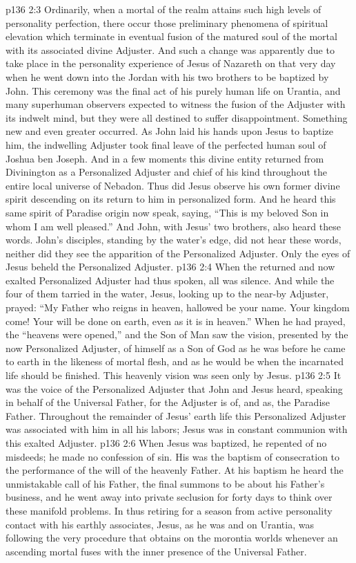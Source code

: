 \vs p136 2:3 Ordinarily, when a mortal of the realm attains such high levels of personality perfection, there occur those preliminary phenomena of spiritual elevation which terminate in eventual fusion of the matured soul of the mortal with its associated divine Adjuster. And such a change was apparently due to take place in the personality experience of Jesus of Nazareth on that very day when he went down into the Jordan with his two brothers to be baptized by John. This ceremony was the final act of his purely human life on Urantia, and many superhuman observers expected to witness the fusion of the Adjuster with its indwelt mind, but they were all destined to suffer disappointment. Something new and even greater occurred. As John laid his hands upon Jesus to baptize him, the indwelling Adjuster took final leave of the perfected human soul of Joshua ben Joseph. And in a few moments this divine entity returned from Divinington as a Personalized Adjuster and chief of his kind throughout the entire local universe of Nebadon. Thus did Jesus observe his own former divine spirit descending on its return to him in personalized form. And he heard this same spirit of Paradise origin now speak, saying, “This is my beloved Son in whom I am well pleased.” And John, with Jesus’ two brothers, also heard these words. John’s disciples, standing by the water’s edge, did not hear these words, neither did they see the apparition of the Personalized Adjuster. Only the eyes of Jesus beheld the Personalized Adjuster.\plusone
\pc \vs p136 2:4 When the returned and now exalted Personalized Adjuster had thus spoken, all was silence. And while the four of them tarried in the water, Jesus, looking up to the near\hyp{}by Adjuster, prayed: \textcolor{ubdarkred}{“My Father who reigns in heaven, hallowed be your name. Your kingdom come! Your will be done on earth, even as it is in heaven.”} When he had prayed, the “heavens were opened,” and the Son of Man saw the vision, presented by the now Personalized Adjuster, of himself as a Son of God as he was before he came to earth in the likeness of mortal flesh, and as he would be when the incarnated life should be finished. This heavenly vision was seen only by Jesus.
\vs p136 2:5 It was the voice of the Personalized Adjuster that John and Jesus heard, speaking in behalf of the Universal Father, for the Adjuster is of, and as, the Paradise Father. Throughout the remainder of Jesus’ earth life this Personalized Adjuster was associated with him in all his labors; Jesus was in constant communion with this exalted Adjuster.
\pc \vs p136 2:6 When Jesus was baptized, he repented of no misdeeds; he made no confession of sin. His was the baptism of consecration to the performance of the will of the heavenly Father. At his baptism he heard the unmistakable call of his Father, the final summons to be about his Father’s business, and he went away into private seclusion for forty days to think over these manifold problems. In thus retiring for a season from active personality contact with his earthly associates, Jesus, as he was and on Urantia, was following the very procedure that obtains on the morontia worlds whenever an ascending mortal fuses with the inner presence of the Universal Father.
